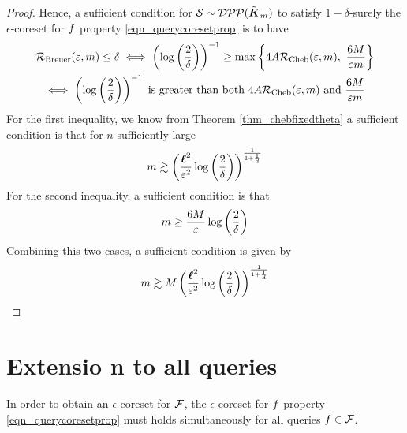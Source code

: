 \begin{proof}
	
	Hence, a sufficient condition for $\mathcal{S} \sim \mathcal{DPP}(\tilde{\boldsymbol K}_{m})$ to satisfy $1-\delta$-surely the $\epsilon$-coreset for $f$  property \ref{eqn_querycoresetprop} is to have
	\begin{gather*}
		\mathcal{R}_{\textrm{Breuer}}(\varepsilon,m) \leq \delta
		\iff 
		\left(\log \left( \frac{2}{\delta }\right)\right)^{-1} \geq
		\max\left\{
			4 A \mathcal{R}_{\textrm{Cheb}}(\varepsilon, m),\
			\frac{6 M}{\varepsilon m}\right\}
		\\
		\iff \left(\log \left( \frac{2}{\delta }\right)\right)^{-1} \text{ is greater than both }
		4 A \mathcal{R}_{\textrm{Cheb}}(\varepsilon, m)
		\text{ and }
		\frac{6 M}{\varepsilon m}
	\end{gather*}
	For the first inequality, we know from Theorem \ref{thm_chebfixedtheta} a sufficient condition is that for $n$ sufficiently large 
	\begin{equation*}
		m \gtrsim \left(\frac{\boldsymbol\ell^2}{\varepsilon^2} \log \left( \frac{2}{\delta }\right) \right)^{\frac{1}{1+\frac 1 d}}
	\end{equation*}
	For the second inequality, a sufficient condition is that
	\begin{equation*}
		m \geq \frac{6 M}{\varepsilon} \log \left( \frac{2}{\delta }\right) 
	\end{equation*}
	Combining this two cases, a sufficient condition is given by
	\begin{equation*}
		m \gtrsim M\left(\frac{\boldsymbol\ell^2}{\varepsilon^2} \log \left( \frac{2}{\delta }\right) \right)^{\frac{1}{1+\frac 1 d}}
	\end{equation*}

\end{proof}
		 
		 



\section{Extensio
n to all queries}
In order to obtain an $\epsilon$-coreset for $\mathcal{F}$, the $\epsilon$-coreset for $f$ property \ref{eqn_querycoresetprop} must holds simultaneously for all queries $f \in \mathcal{F}$.









